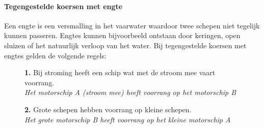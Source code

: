 \paragraph{Tegengestelde koersen met engte}
Een engte is een versmalling in het vaarwater waardoor twee schepen niet tegelijk kunnen passeren. Engtes kunnen bijvoorbeeld ontstaan door keringen, open sluizen of het natuurlijk verloop van het water. Bij tegengestelde koersen met engtes gelden de volgende regels:

\begin{figure}[H]
	\centering
	\begin{minipage}[t]{0.70\textwidth}
		\textbf{1.} Bij stroming heeft een schip wat met de stroom mee vaart voorrang.\\
		\textit{Het motorschip A (stroom mee) heeft voorrang op het motorschip B}
	\end{minipage}
	\hfill
	\begin{minipage}[t]{0.25\textwidth}
		\label{pic:engte:1}
	\end{minipage}
	\hfill
\end{figure}
\vspace{-0.7cm}

\begin{figure}[H]
	\centering
	\begin{minipage}[t]{0.70\textwidth}
		\textbf{2.} Grote schepen hebben voorrang op kleine schepen.\\
		\textit{Het grote motorschip B heeft voorrang op het kleine motorschip A}
	\end{minipage}
	\hfill
	\begin{minipage}[t]{0.25\textwidth}
		\label{pic:engte:2}
	\end{minipage}
	\hfill
\end{figure}
\vspace{-0.5cm}

